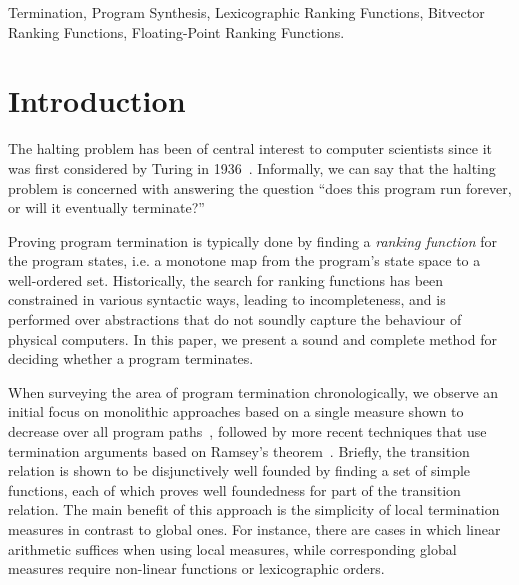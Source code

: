 \documentclass[preprint]{sigplanconf}
\theoremstyle{definition}
\begin{document}
\keywords
Termination, Program Synthesis, Lexicographic Ranking Functions, Bitvector Ranking Functions,
Floating-Point Ranking Functions.

\section{Introduction}\label{sec:intro}

The halting problem has been of central interest to computer scientists
since it was first considered by Turing in 1936~\cite{turing}.  Informally,
we can say that the halting problem is concerned with answering the question
``does this program run forever, or will it eventually terminate?''

Proving program termination is typically done by finding a \emph{ranking
function} for the program states, i.e.  a monotone map from the program's
state space to a well-ordered set.  Historically, the search for ranking
functions has been constrained in various syntactic ways, leading to
incompleteness, and is performed over abstractions that do not soundly
capture the behaviour of physical computers.  In this paper, we present a
sound and complete method for deciding whether a program terminates.


When surveying the area of program termination chronologically, we observe
an initial focus on monolithic approaches based on a single measure shown to
decrease over all program
paths~\cite{DBLP:conf/vmcai/P04,DBLP:conf/cav/BradleyMS05}, followed by more
recent techniques that use termination arguments based on Ramsey's
theorem~\cite{DBLP:conf/lpe/CodishG03,DBLP:conf/lics/PodelskiR04,DBLP:conf/pldi/CookPR06}. 
Briefly, the transition relation is shown to be disjunctively well founded
by finding a set of simple functions, each of which proves well foundedness
for part of the transition relation.  The main benefit of this approach is
the simplicity of local termination measures in contrast to global ones. 
For instance, there are cases in which linear arithmetic suffices when using
local measures, while corresponding global measures require non-linear
functions or lexicographic orders.
\end{document}

